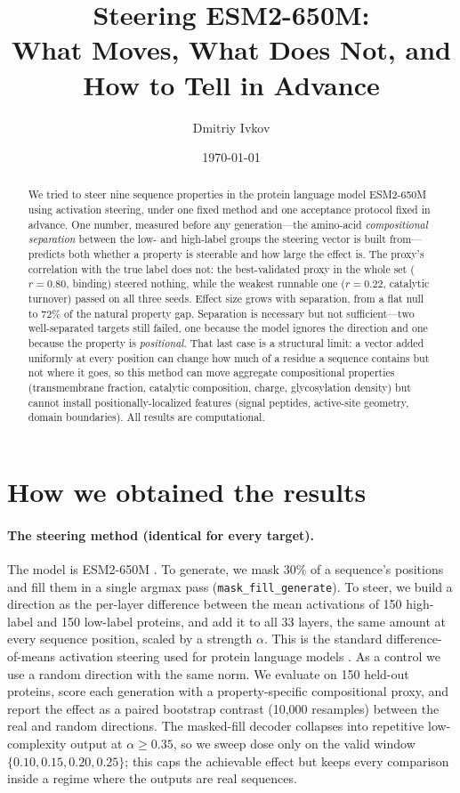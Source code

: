 \documentclass[11pt]{article}
\title{Steering ESM2-650M:\\
What Moves, What Does Not, and How to Tell in Advance}
\author{Dmitriy Ivkov}
\date{\today}
\begin{document}
\maketitle

\begin{abstract}
We tried to steer nine sequence properties in the protein language model
ESM2-650M using activation steering, under one fixed method and one acceptance
protocol fixed in advance. One number, measured before any generation---the
amino-acid \emph{compositional separation} between the low- and high-label
groups the steering vector is built from---predicts both whether a property is
steerable and how large the effect is. The proxy's correlation with the true
label does not: the best-validated proxy in the whole set ($r=0.80$, binding)
steered nothing, while the weakest runnable one ($r=0.22$, catalytic turnover)
passed on all three seeds. Effect size grows with separation, from a flat null
to $72\%$ of the natural property gap. Separation is necessary but not
sufficient---two well-separated targets still failed, one because the model
ignores the direction and one because the property is \emph{positional}. That
last case is a structural limit: a vector added uniformly at every position can
change how much of a residue a sequence contains but not where it goes, so this
method can move aggregate compositional properties (transmembrane fraction,
catalytic composition, charge, glycosylation density) but cannot install
positionally-localized features (signal peptides, active-site geometry, domain
boundaries). All results are computational.
\end{abstract}

\section{How we obtained the results}

\paragraph{The steering method (identical for every target).}
The model is ESM2-650M \citep{lin2023esm}. To generate, we mask 30\% of a
sequence's positions and fill them in a single argmax pass
(\texttt{mask\_fill\_generate}). To steer, we build a direction as the
per-layer difference between the mean activations of 150 high-label and 150
low-label proteins, and add it to all 33 layers, the same amount at every
sequence position, scaled by a strength $\alpha$. This is the standard
difference-of-means activation steering used for protein language models
\citep{huang2025steering}. As a control we use a random direction with the same
norm. We evaluate on 150 held-out proteins, score each generation with a
property-specific compositional proxy, and report the effect as a paired
bootstrap contrast (10{,}000 resamples) between the real and random directions.
The masked-fill decoder collapses into repetitive low-complexity output at
$\alpha\ge0.35$, so we sweep dose only on the valid window
$\{0.10,0.15,0.20,0.25\}$; this caps the achievable effect but keeps every
comparison inside a regime where the outputs are real sequences.
\end{document}
